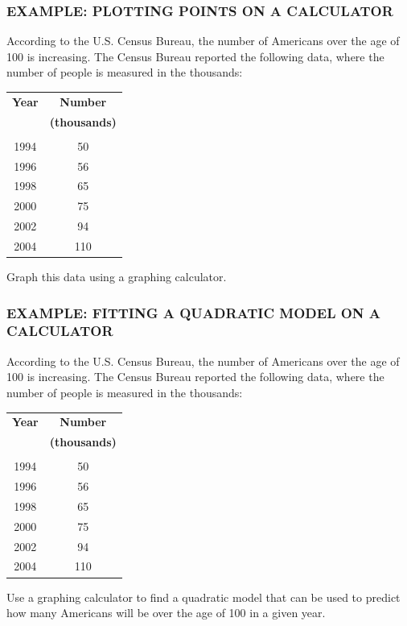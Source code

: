 \documentclass[8pt]{beamer}
\newcommand{\extitle}[1]{\frametitle{\fontfamily{fvs}\selectfont \small\color{black!70!blue!80!cyan}\uppercase{\bfseries Example: #1}}}
\begin{document}
\begin{frame}
\extitle{Plotting Points on a Calculator}
According to the U.S. Census Bureau, the number of Americans over the age of 100 is increasing.  The Census Bureau reported the following data, where the number of people is measured in the thousands:
\begin{center}
\begin{tabular}{c c}
\textbf{Year} & \textbf{Number}\\
& \textbf{(thousands)}\\
\hline
& \\
1994 & 50\\
1996 & 56\\
1998 & 65\\
2000 & 75\\
2002 & 94\\
2004 & 110
\end{tabular}
\end{center}

Graph this data using a graphing calculator.
\end{frame}

\begin{frame}
\extitle{Fitting a Quadratic Model on a Calculator}
According to the U.S. Census Bureau, the number of Americans over the age of 100 is increasing.  The Census Bureau reported the following data, where the number of people is measured in the thousands:
\begin{center}
\begin{tabular}{c c}
\textbf{Year} & \textbf{Number}\\
& \textbf{(thousands)}\\
\hline
& \\
1994 & 50\\
1996 & 56\\
1998 & 65\\
2000 & 75\\
2002 & 94\\
2004 & 110
\end{tabular}
\end{center}
Use a graphing calculator to find a quadratic model that can be used to predict how many Americans will be over the age of 100 in a given year.
\end{frame}
\end{document}
